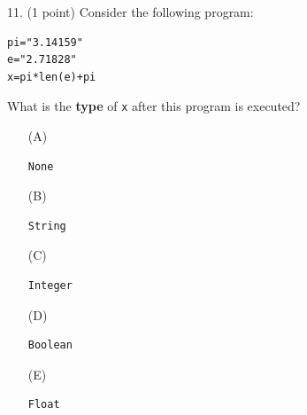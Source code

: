 \documentclass{article}
\begin{document}
\noindent
\begin{minipage}{\textwidth}
11. (1 point)
Consider the following program:
\begin{verbatim}
pi="3.14159"
e="2.71828"
x=pi*len(e)+pi
\end{verbatim}
What is the \textbf{type} of \texttt{x} after this program is executed?

\begin{enumerate}
\item[(A)]
\begin{verbatim}None\end{verbatim}

\item[(B)]
\begin{verbatim}String\end{verbatim}

\item[(C)]
\begin{verbatim}Integer\end{verbatim}

\item[(D)]
\begin{verbatim}Boolean\end{verbatim}

\item[(E)]
\begin{verbatim}Float\end{verbatim}

\end{enumerate}
\end{minipage}
\vspace{2em}
\filbreak\vfil{}\vfilneg
\end{document}
